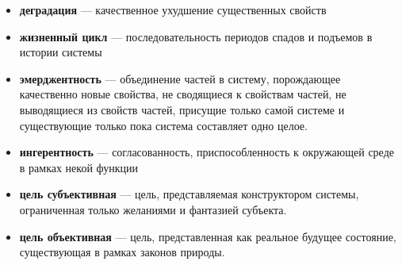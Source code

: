\documentclass{article}
\newcommand{\define}[2]{
	\textbf{#1} --- #2
	}
\begin{document}
{\begin{itemize}
	\item \define{деградация}{качественное ухудшение существенных свойств}	
	\item \define{жизненный цикл}{последовательность периодов спадов и подъемов в истории системы}
	\item \define{эмерджентность}{объединение частей в систему, порождающее качественно новые свойства, не сводящиеся к свойствам частей, не выводящиеся из свойств частей, присущие только самой системе и существующие только пока система составляет одно целое.}
	\item \define{ингерентность}{согласованность, приспособленность к окружающей среде в рамках некой функции}
	\item \define{цель субъективная}{цель, представляемая конструктором системы, ограниченная только желаниями и фантазией субъекта.}
	\item \define{цель объективная}{цель, представленная как реальное будущее состояние, существующая в рамках законов природы.}
\end{itemize}}
\end{document}
